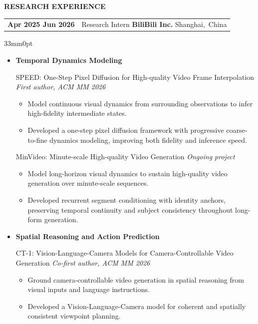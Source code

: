 \documentclass[10pt,a4paper]{article}
\makeatletter
\newcommand{\Section}[1]{%
  \vspace{3.5pt}%
  {\color{Ink}\bfseries\fontsize{10}{12}\selectfont\MakeUppercase{#1}\par}%
  \vspace{2.5pt}%
}
\newcommand{\Meta}[1]{{\color{Soft}\fontsize{8.5}{11.5}\selectfont #1}}
\newcommand{\BodyInk}[1]{{\color{Ink}\fontsize{8.5}{11.5}\selectfont #1}}
\newenvironment{Contributions}{%
  \begin{itemize}[
    leftmargin=3.4mm,
    labelsep=1.2mm,
    label=\textcolor{Accent}{\raisebox{0.15ex}{\scriptsize\textbullet}},
    topsep=1.2pt,
    itemsep=0.6pt,
    parsep=0pt,
    partopsep=0pt
  ]
  \color{Muted}\fontsize{8.15}{10.45}\selectfont
}{\end{itemize}}
\newcommand{\ThemeProject}[3]{%
  {\color{Ink}\fontsize{8.5}{11.5}\selectfont
  #1%
  {\color{Soft}\textemdash{} \textit{#2}}\par}%
#3
\vspace{0.5pt}%
}
\newenvironment{ResearchThemeList}{%
\begin{itemize}[
  leftmargin=3.8mm,
  labelsep=1.4mm,
  label=\textcolor{Accent}{\raisebox{0.12ex}{\small\textbullet}},
  topsep=0.5pt,
  itemsep=2.8pt,
  parsep=0pt,
  partopsep=0pt
]
}{\end{itemize}}
\newcommand{\ExperienceEntry}[4]{%
\par\addvspace{2pt}%
\noindent
\begin{tabularx}{\textwidth}{@{}p{31mm}@{\hspace{2mm}}X@{}}
  \Meta{\textbf{#1}} &
  \BodyInk{Research Intern \textperiodcentered{} \textbf{#2}}%
  \hfill\mbox{\Meta{#3}}
\end{tabularx}\par
\nopagebreak[4]%
\vspace{1.1pt}%
\begin{adjustwidth}{33mm}{0pt}
  #4
\end{adjustwidth}%
\par\addvspace{6pt}%
}
\makeatother
\begin{document}
\Section{Research Experience}
\ExperienceEntry
{Apr 2025 \textemdash{} Jun 2026}
{BiliBili Inc.}
{Shanghai, China}
{%
  \begin{ResearchThemeList}

    \item
    {\color{Ink}\bfseries\fontsize{8.7}{11.5}\selectfont
      Temporal Dynamics Modeling\par}
    \vspace{0.6pt}

    \ThemeProject
      {SPEED: One-Step Pixel Diffusion for High-quality Video Frame
      Interpolation}
      {First author, ACM MM 2026}
      {\begin{Contributions}
        \item Model continuous visual dynamics from surrounding observations
        to infer high-fidelity intermediate states.
        \item Developed a one-step pixel diffusion framework with
        progressive coarse-to-fine dynamics modeling, improving both
        fidelity and inference speed.
      \end{Contributions}}

    \ThemeProject
      {MinVideo: Minute-scale High-quality Video Generation}
      {Ongoing project}
      {\begin{Contributions}
        \item Model long-horizon visual dynamics to sustain high-quality
        video generation over minute-scale sequences.
        \item Developed recurrent segment conditioning with identity
        anchors, preserving temporal continuity and subject consistency
        throughout long-form generation.
      \end{Contributions}}

    \item
    {\color{Ink}\bfseries\fontsize{8.7}{11.5}\selectfont
      Spatial Reasoning and Action Prediction\par}
    \vspace{0.6pt}

    \ThemeProject
      {CT-1: Vision-Language-Camera Models for Camera-Controllable Video Generation}
      {Co-first author, ACM MM 2026}
      {\begin{Contributions}
        \item Ground camera-controllable video generation in spatial
        reasoning from visual inputs and language instructions.
        \item Developed a Vision-Language-Camera model for coherent and
        spatially consistent viewpoint planning.
      \end{Contributions}}


\end{ResearchThemeList}}
\end{document}

